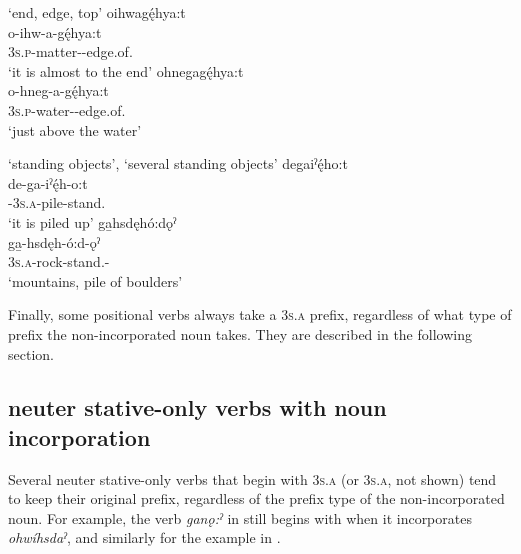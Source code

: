 \ea\label{ex:positppchoiceex602}  ‘end, edge, top’
\ea oihwagę́hya:t\\
\gll o-ihw-a-gę́hya:t\\
 \textsc{3s.p}-matter-{\joinerA}-edge.of.{\stative}\\
\glt `it is almost to the end'
\ex ohnegagę́hya:t\\
\gll o-hneg-a-gę́hya:t\\
 \textsc{3s.p}-water-{\joinerA}-edge.of.{\stative}\\
\glt `just above the water'
\z
\z

\ea\label{ex:positppchoiceex603}  ‘standing objects’,  ‘several standing objects’
\ea degaiˀę́ho:t\\
\gll de-ga-iˀę́h-o:t\\
 {\dualic}-\textsc{3s.a}-pile-stand.{\stative}\\
\glt `it is piled up'
\ex ga̱hsdęhó:dǫˀ\\
\gll ga̱-hsdęh-ó:d-ǫˀ\\
 \textsc{3s.a}-rock-stand.{\stat}-{\distributive}\\
\glt `mountains, pile of boulders'
\z
\z

Finally, some positional verbs always take a  \textsc{3s.a} prefix, regardless of what type of prefix the non-incorporated noun takes. They are described in the following section.


\subsection{ neuter stative-only verbs with noun incorporation} \label{[ga-V] neuter stative-only verbs with noun incorporation}
Several neuter stative-only verbs that begin with  \textsc{3s.a} (or  \textsc{3s.a}, not shown) tend to keep their original prefix, regardless of the prefix type of the non-incorporated noun. For example, the verb \textit{ganǫ:ˀ} in  still begins with  when it incorporates \textit{ohwíhsdaˀ}, and similarly for the example in .

